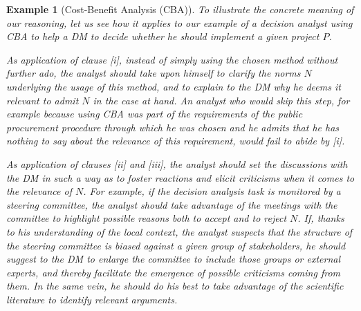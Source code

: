 \documentclass[preprint, french, english, 11pt, authoryear]{elsarticle}%
\newtheorem{example}{Example}
\begin{document}
\begin{example}[Cost-Benefit Analysis (CBA)]
To illustrate the concrete meaning of our reasoning, let us see how it applies to our example of a decision analyst using CBA to help a \ac{DM} to decide whether he should implement a given project $P$.

As application of clause [i], instead of simply using the chosen method without further ado, the analyst should take upon himself to clarify the norms $N$ underlying the usage of this method, and to explain to the \ac{DM} why he deems it relevant to admit $N$ in the case at hand. An analyst who would skip this step, for example because using CBA was part of the requirements of the public procurement procedure through which he was chosen and he admits that he has nothing to say about the relevance of this requirement, would fail to abide by [i].

As application of clauses [ii] and [iii], the analyst should set the discussions with the \ac{DM} in such a way as to foster reactions and elicit criticisms when it comes to the relevance of $N$. For example, if the decision analysis task is monitored by a steering committee, the analyst should take advantage of the meetings with the committee to highlight possible reasons both to accept and to reject $N$. If, thanks to his understanding of the local context, the analyst suspects that the structure of the steering committee is biased against a given group of stakeholders, he should suggest to the \ac{DM} to enlarge the committee to include those groups or external experts, and thereby facilitate the emergence of possible criticisms coming from them. In the same vein, he should do his best to take advantage of the scientific literature to identify relevant arguments.  




\end{example}
\end{document}
